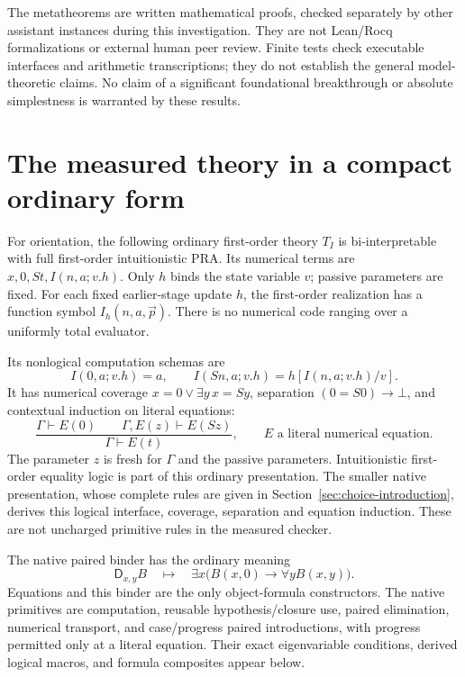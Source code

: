 \documentclass[11pt,letterpaper]{article}
\theoremstyle{definition}\newtheorem{definition}[theorem]{Definition}
\theoremstyle{remark}\newtheorem{remark}[theorem]{Remark}
\begin{document}
The metatheorems are written mathematical proofs, checked separately by other
assistant instances during this investigation. They are not Lean/Rocq
formalizations or external human peer review. Finite tests check executable
interfaces and arithmetic transcriptions; they do not establish the general
model-theoretic claims. No claim of a significant foundational breakthrough
or absolute simplestness is warranted by these results.

\section{The measured theory in a compact ordinary form}
\label{sec:ordinary-core}

For orientation, the following ordinary first-order theory $T_I$ is
bi-interpretable with full first-order intuitionistic PRA. Its numerical
terms are $x,0,St,I(n,a;v.h)$. Only $h$ binds the state variable $v$;
passive parameters are fixed. For each fixed earlier-stage update $h$, the
first-order realization has a function symbol $I_h(n,a,\vec p)$.
There is no numerical code ranging over a uniformly total evaluator.

Its nonlogical computation schemas are
\[
 I(0,a;v.h)=a,\qquad I(Sn,a;v.h)=h[I(n,a;v.h)/v].
\]
It has numerical coverage $x=0\lor\exists y\,x=Sy$, separation
$(0=S0)\to\bot$, and contextual induction on literal equations:
\[
 \frac{\Gamma\vdash E(0)\qquad\Gamma,E(z)\vdash E(Sz)}
      {\Gamma\vdash E(t)},
 \qquad E\text{ a literal numerical equation}.
\]
The parameter $z$ is fresh for $\Gamma$ and the passive parameters.
Intuitionistic first-order equality logic is part of this ordinary
presentation. The smaller native presentation, whose complete rules are
given in Section~\ref{sec:choice-introduction}, derives this logical interface,
coverage, separation and equation induction. These are not uncharged
primitive rules in the measured checker.

The native paired binder has the ordinary meaning
\[
 \mathsf D_{x,y}B\quad\mapsto\quad
 \exists x\bigl(B(x,0)\to\forall y B(x,y)\bigr).
\]
Equations and this binder are the only object-formula constructors. The
native primitives are computation, reusable hypothesis/closure use, paired
elimination, numerical transport, and case/progress paired introductions,
with progress permitted only at a literal equation. Their exact eigenvariable
conditions, derived logical macros, and formula composites appear below.
\end{document}

